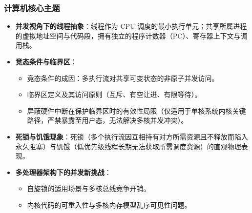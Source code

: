 \subsubsection{计算机核心主题}
\begin{itemize}\setlength{\itemsep}{0pt}\setlength{\parskip}{0pt}
    \item \textbf{并发视角下的线程抽象}：线程作为 CPU 调度的最小执行单元；共享所属进程的虚拟地址空间与代码段，拥有独立的程序计数器（PC）、寄存器上下文与调用栈。
    \item \textbf{竞态条件与临界区}：
    \begin{itemize}\setlength{\itemsep}{0pt}\setlength{\parskip}{0pt}
        \item 竞态条件的成因：多执行流对共享可变状态的非原子并发访问。
        \item 临界区定义及其访问原则（互斥、有空让进、有限等待）。
        \item 屏蔽硬件中断在保护临界区时的有效性局限（仅适用于单核系统内核关键路径，严禁暴露至用户态，无法解决多核并发冲突）。
    \end{itemize}
    \item \textbf{死锁与饥饿现象}：死锁（多个执行流因互相持有对方所需资源且不释放而陷入永久阻塞）与饥饿（低优先级线程长期无法获取所需调度资源）的直观物理表现。
    \item \textbf{多处理器架构下的并发新挑战}：
    \begin{itemize}\setlength{\itemsep}{0pt}\setlength{\parskip}{0pt}
        \item 自旋锁的适用场景与多核总线竞争开销。
        \item 内核代码的可重入性与多核内存模型乱序可见性问题。
    \end{itemize}
\end{itemize}

